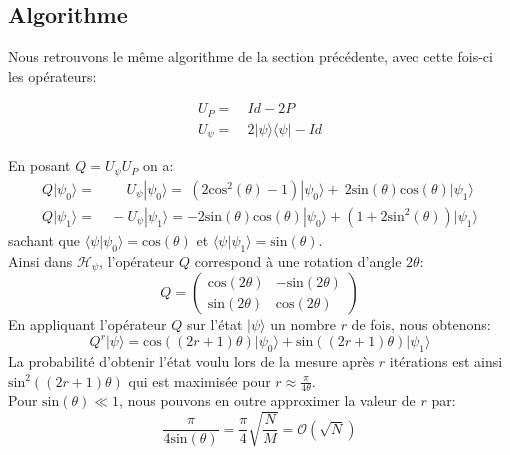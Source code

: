 \subsection{Algorithme}

Nous retrouvons le même algorithme de la section précédente, avec cette fois-ci les opérateurs:

\begin{align*}
	U_{P} = & \ Id - 2P \\
    U_{\psi} = & \ 2 | \psi \rangle \langle \psi | - Id
\end{align*}

\noindent En posant $Q = U_{\psi} U_{P} $ on a:
\begin{align*}
	Q | \psi_0 \rangle =& \quad \ \, U_{\psi} | \psi_0 \rangle = \ (2 \mathrm{cos}^2(\theta)-1) | \psi_0 \rangle + \ 2 \mathrm{sin}(\theta)\mathrm{cos}(\theta) | \psi_1 \rangle \\
    Q | \psi_1 \rangle =&\ -U_{\psi} | \psi_1 \rangle = -2 \mathrm{sin}(\theta)\mathrm{cos}(\theta) | \psi_0 \rangle + (1 + 2 \mathrm{sin}^2(\theta)) | \psi_1 \rangle
\end{align*}
sachant que $\langle \psi | \psi_0 \rangle = \mathrm{cos}(\theta)$ et $\langle \psi | \psi_1 \rangle = \mathrm{sin}(\theta)$.
\\
Ainsi dans $\mathcal{H}_{\psi}$, l'opérateur $Q$ correspond à une rotation d'angle $2\theta$:
\[
Q =
\begin{pmatrix}
\mathrm{cos}(2\theta) & -\mathrm{sin}(2\theta) \\
\mathrm{sin}(2\theta) & \mathrm{cos}(2\theta)
\end{pmatrix}
\]
En appliquant l'opérateur $Q$ sur l'état $| \psi \rangle$ un nombre $r$ de fois, nous obtenons:
\[ Q^r | \psi \rangle = \mathrm{cos}((2r+1)\theta)| \psi_0 \rangle + \mathrm{sin}((2r+1)\theta)| \psi_1 \rangle\]
La probabilité d'obtenir l'état voulu lors de la mesure après $r$ itérations est ainsi $\mathrm{sin}^2 \left( \left( 2r + 1 \right) \theta \right)$ qui est maximisée pour $r \approx \frac{\pi}{4\theta}$. 
\\
Pour $\mathrm{sin}(\theta) \ll 1$, nous pouvons en outre approximer la valeur de $r$ par: \[\frac{\pi}{4\mathrm{sin}(\theta)} = \frac{\pi}{4} \sqrt{\frac{N}{M}} = \mathcal{O}(\sqrt{N})\]
